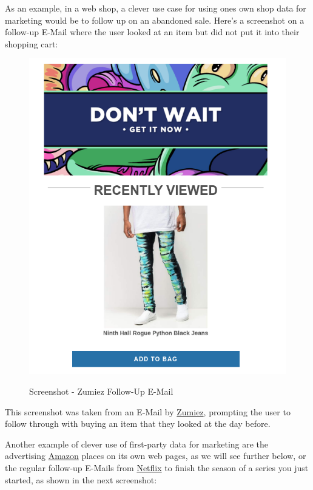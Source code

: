 As an example, in a web shop, a clever use case for using ones own shop data for marketing would be to follow up on an abandoned sale. Here's a screenshot on a follow-up E-Mail where the user looked at an item but did not put it into their shopping cart:

\begin{figure}[H]
\centering
\caption {Screenshot - Zumiez Follow-Up E-Mail}
\includegraphics[scale=0.6]{images/zumiez-dont-wait.png}
\label{fig:zumiez}
\end{figure}

This screenshot was taken from an E-Mail by \href{https://www.zumiez.com/}{Zumiez}, prompting the user to follow through with buying an item that they looked at the day before.

Another example of clever use of first-party data for marketing are the advertising \href{https://smile.amazon.de/}{Amazon} places on its own web pages, as we will see further below, or the regular follow-up E-Mails from \href{https://www.netflix.com/de-en/}{Netflix} to finish the season of a series you just started, as shown in the next screenshot:

